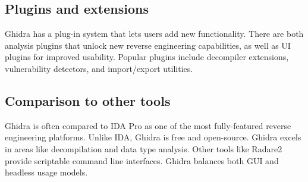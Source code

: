 \subsection{Plugins and extensions}
Ghidra has a plug-in system that lets users add new functionality. There are both analysis plugins that unlock new reverse engineering capabilities, as well as UI plugins for improved usability. Popular plugins include decompiler extensions, vulnerability detectors, and import/export utilities.

\subsection{Comparison to other tools}
Ghidra is often compared to IDA Pro as one of the most fully-featured reverse engineering platforms. Unlike IDA, Ghidra is free and open-source. Ghidra excels in areas like decompilation and data type analysis. Other tools like Radare2 provide scriptable command line interfaces. Ghidra balances both GUI and headless usage models.